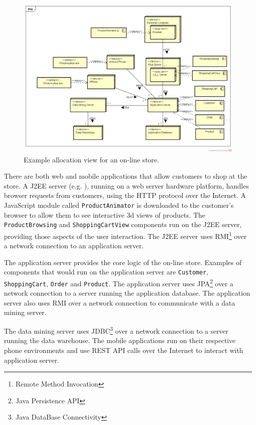 \begin{figure}[h]
    \includegraphics[trim=37 57 20 40,clip,width=\textwidth]{images/deployment_diagram.png}
    \caption{Example allocation view for an on-line store.}
    \label{fig:deploymentDiagram}
\end{figure}

\noindent
There are both web and mobile applications that allow customers to shop at the store.
A J2EE server (e.g. ), running on a web server hardware platform,
handles browser requests from customers, using the HTTP protocol over the Internet.
A JavaScript module called \texttt{ProductAnimator} is downloaded to the customer's browser to allow them to see interactive 3d views of products.
The \texttt{ProductBrowsing} and \texttt{ShoppingCartView} components run on the J2EE server, providing those aspects of the user interaction.
The J2EE server uses RMI\footnote{Remote Method Invocation} over a network connection to an application server.

The application server provides the core logic of the on-line store.
Examples of components that would run on the application server are \texttt{Customer}, \texttt{ShoppingCart}, \texttt{Order} and \texttt{Product}.
The application server uses JPA\footnote{Java Persistence API} over a network connection to a server running the application database.
The application server also uses RMI over a network connection to communicate with a data mining server.

The data mining server uses JDBC\footnote{Java DataBase Connectivity} over a network connection to a server running the data warehouse.
The mobile applications run on their respective phone environments and use REST API calls over the Internet to interact with application server.

